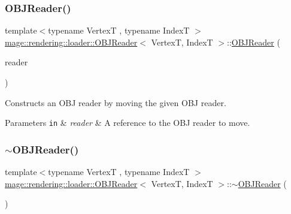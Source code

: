 \subsubsection{\texorpdfstring{O\+B\+J\+Reader()}{OBJReader()}\hspace{0.1cm}{\footnotesize\ttfamily [3/3]}}
{\footnotesize\ttfamily template$<$typename VertexT , typename IndexT $>$ \\
\hyperlink{classmage_1_1rendering_1_1loader_1_1_o_b_j_reader}{mage\+::rendering\+::loader\+::\+O\+B\+J\+Reader}$<$ VertexT, IndexT $>$\+::\hyperlink{classmage_1_1rendering_1_1loader_1_1_o_b_j_reader}{O\+B\+J\+Reader} (\begin{DoxyParamCaption}\item[{\hyperlink{classmage_1_1rendering_1_1loader_1_1_o_b_j_reader}{O\+B\+J\+Reader}$<$ VertexT, IndexT $>$ \&\&}]{reader }\end{DoxyParamCaption})\hspace{0.3cm}{\ttfamily [noexcept]}}

Constructs an O\+BJ reader by moving the given O\+BJ reader.


\begin{DoxyParams}[1]{Parameters}
\mbox{\tt in}  & {\em reader} & A reference to the O\+BJ reader to move. \\
\hline
\end{DoxyParams}
\hypertarget{classmage_1_1rendering_1_1loader_1_1_o_b_j_reader_a2b10c4cbb4c4aea192c78045beb4735e}{}\label{classmage_1_1rendering_1_1loader_1_1_o_b_j_reader_a2b10c4cbb4c4aea192c78045beb4735e} 
\subsubsection{\texorpdfstring{$\sim$\+O\+B\+J\+Reader()}{~OBJReader()}}
{\footnotesize\ttfamily template$<$typename VertexT , typename IndexT $>$ \\
\hyperlink{classmage_1_1rendering_1_1loader_1_1_o_b_j_reader}{mage\+::rendering\+::loader\+::\+O\+B\+J\+Reader}$<$ VertexT, IndexT $>$\+::$\sim$\hyperlink{classmage_1_1rendering_1_1loader_1_1_o_b_j_reader}{O\+B\+J\+Reader} (\begin{DoxyParamCaption}{ }\end{DoxyParamCaption})}

